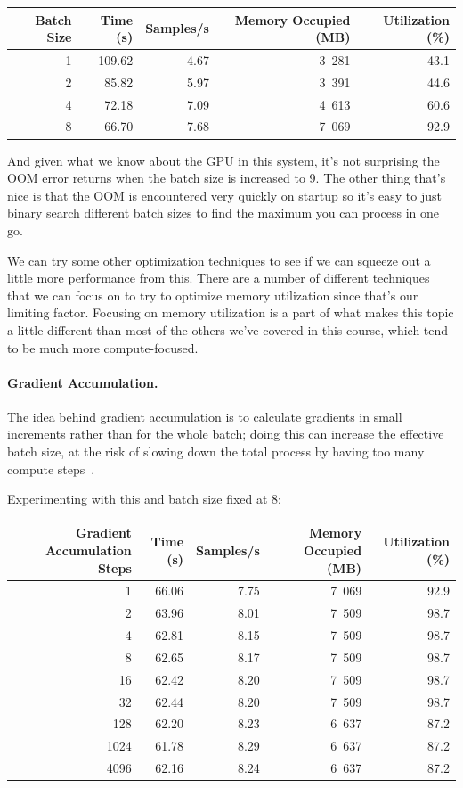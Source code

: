 \documentclass[a4paper]{report}
\begin{document}
\begin{center}
\begin{tabular}{r|r|r|r|r}
\textbf{Batch Size} & \textbf{Time (s)} & \textbf{Samples/s} & \textbf{Memory Occupied (MB)} & \textbf{Utilization (\%)} \\ \hline
1 & 109.62 & 4.67 & 3~281 & 43.1 \\
2 & 85.82 & 5.97 & 3~391 & 44.6 \\
4 & 72.18 & 7.09 & 4~613 & 60.6 \\
8 & 66.70 & 7.68 & 7~069 & 92.9 \\
\end{tabular}
\end{center}

And given what we know about the GPU in this system, it's not surprising the OOM error returns when the batch size is increased to 9. The other thing that's nice is that the OOM is encountered very quickly on startup so it's easy to just binary search different batch sizes to find the maximum you can process in one go. 

We can try some other optimization techniques to see if we can squeeze out a little more performance from this. There are a number of different techniques that we can focus on to try to optimize memory utilization since that's our limiting factor. Focusing on memory utilization is a part of what makes this topic a little different than most of the others we've covered in this course, which tend to be much more compute-focused. 

\paragraph{Gradient Accumulation.} The idea behind gradient accumulation is to calculate gradients in small increments rather than for the whole batch; doing this can increase the effective batch size, at the risk of slowing down the total process by having too many compute steps~\cite{hf}.

Experimenting with this and batch size fixed at 8:

\begin{center}
\begin{tabular}{r|r|r|r|r}
\textbf{Gradient Accumulation Steps} & \textbf{Time (s)} & \textbf{Samples/s} & \textbf{Memory Occupied (MB)} & \textbf{Utilization (\%)} \\ \hline
1 & 66.06 & 7.75 & 7~069 & 92.9 \\
2 & 63.96 & 8.01 & 7~509 & 98.7 \\
4 & 62.81 & 8.15 & 7~509 & 98.7 \\
8 & 62.65 & 8.17 & 7~509 & 98.7 \\
16 & 62.42 & 8.20 & 7~509 & 98.7 \\
32 & 62.44 & 8.20 & 7~509 & 98.7\\
128 & 62.20 & 8.23 & 6~637 & 87.2\\
1024 & 61.78 & 8.29 & 6~637 & 87.2 \\
4096 & 62.16 & 8.24 & 6~637 & 87.2
\end{tabular}
\end{center}
\end{document}

